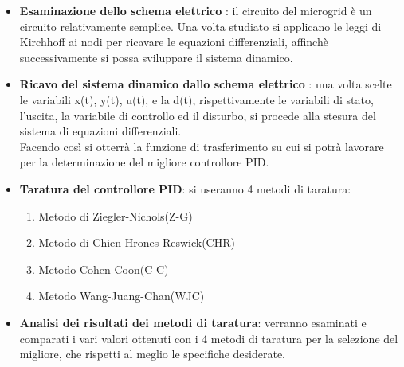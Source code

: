 \begin{itemize}
    \item \textbf{Esaminazione dello schema elettrico} : il circuito del microgrid è un circuito relativamente semplice. Una volta studiato si applicano le leggi di Kirchhoff ai nodi per ricavare le equazioni differenziali, affinchè successivamente si possa sviluppare il sistema dinamico. 
    \item \textbf{Ricavo del sistema dinamico dallo schema elettrico }: una volta scelte le variabili x(t), y(t), u(t), e la d(t), rispettivamente le variabili di stato, l'uscita, la variabile di controllo ed il disturbo, si procede alla stesura del sistema di equazioni differenziali. \\Facendo così si otterrà la funzione di trasferimento su cui si potrà lavorare per la determinazione del migliore controllore PID.
    \item \textbf{Taratura del controllore PID}: si useranno 4 metodi di taratura:\begin{enumerate}
        \item Metodo di Ziegler-Nichols(Z-G)
        \item Metodo di Chien-Hrones-Reswick(CHR)
        \item Metodo Cohen-Coon(C-C)
        \item Metodo Wang-Juang-Chan(WJC)
    \end{enumerate}
    \item \textbf{Analisi dei risultati dei metodi di taratura}: verranno esaminati e comparati i vari valori ottenuti con i 4 metodi di taratura per la selezione del migliore, che rispetti al meglio le specifiche desiderate.
\end{itemize}

